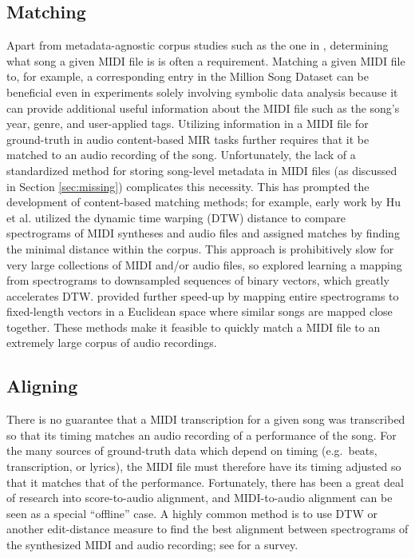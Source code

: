 \documentclass{article}
\begin{document}
\subsection{Matching}

Apart from metadata-agnostic corpus studies such as the one in \cite{mauch2012corpus}, determining what song a given MIDI file is is often a requirement.
Matching a given MIDI file to, for example, a corresponding entry in the Million Song Dataset \cite{bertin2011million} can be beneficial even in experiments solely involving symbolic data analysis because it can provide additional useful information about the MIDI file such as the song's year, genre, and user-applied tags.
Utilizing information in a MIDI file for ground-truth in audio content-based MIR tasks further requires that it be matched to an audio recording of the song.
Unfortunately, the lack of a standardized method for storing song-level metadata in MIDI files (as discussed in Section \ref{sec:missing}) complicates this necessity.
This has prompted the development of content-based matching methods; for example, early work by Hu et al.\cite{hu2003polyphonic} utilized the dynamic time warping (DTW) distance to compare spectrograms of MIDI syntheses and audio files and assigned matches by finding the minimal distance within the corpus.
This approach is prohibitively slow for very large collections of MIDI and/or audio files, so \cite{raffel2015large} explored learning a mapping from spectrograms to downsampled sequences of binary vectors, which greatly accelerates DTW.
\cite{raffel2016pruning} provided further speed-up by mapping entire spectrograms to fixed-length vectors in a Euclidean space where similar songs are mapped close together.
These methods make it feasible to quickly match a MIDI file to an extremely large corpus of audio recordings.

\subsection{Aligning}

There is no guarantee that a MIDI transcription for a given song was transcribed so that its timing matches an audio recording of a performance of the song.
For the many sources of ground-truth data which depend on timing (e.g.\ beats, transcription, or lyrics), the MIDI file must therefore have its timing adjusted so that it matches that of the performance.
Fortunately, there has been a great deal of research into score-to-audio alignment, and MIDI-to-audio alignment can be seen as a special ``offline'' case.
A highly common method is to use DTW or another edit-distance measure to find the best alignment between spectrograms of the synthesized MIDI and audio recording; see \cite{raffel2016optimizing} for a survey.
\end{document}
